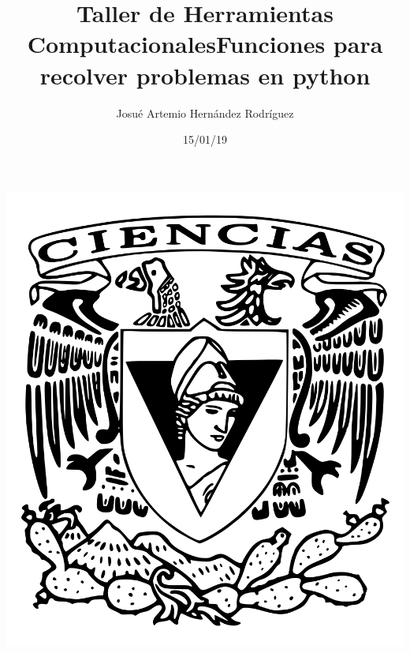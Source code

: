 \documentclass[letterpaper, 12pt, oneside]{article}%
\title{\Huge Taller de Herramientas Computacionales}
\author{Josué Artemio Hernández Rodríguez}%
\date{15/01/19}%
\begin{document}
	\maketitle
	\begin{center}%
		\includegraphics[scale=0.2]{2.png}%
	\end{center}%
	\newpage%
	
	\title{\Huge Funciones para recolver problemas en python\\}%
	
\end{document}
